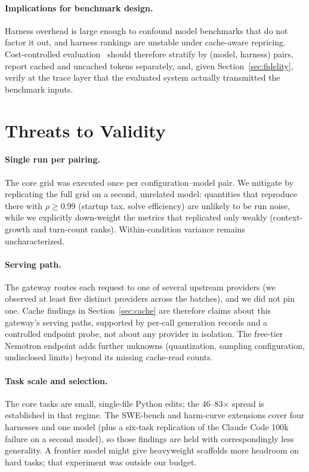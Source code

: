 \documentclass[11pt]{article}
\begin{document}
\paragraph{Implications for benchmark design.}
Harness overhead is large enough to confound model benchmarks that do not factor it out, and harness rankings are unstable under cache-aware repricing. Cost-controlled evaluation~\citep{kapoor2024agents} should therefore stratify by (model, harness) pairs, report cached and uncached tokens separately, and, given Section~\ref{sec:fidelity}, verify at the trace layer that the evaluated system actually transmitted the benchmark inputs.

\section{Threats to Validity}
\label{sec:threats}

\paragraph{Single run per pairing.} The core grid was executed once per configuration--model pair. We mitigate by replicating the full grid on a second, unrelated model: quantities that reproduce there with $\rho \ge 0.99$ (startup tax, solve efficiency) are unlikely to be run noise, while we explicitly down-weight the metrics that replicated only weakly (context-growth and turn-count ranks). Within-condition variance remains uncharacterized.

\paragraph{Serving path.} The gateway routes each request to one of several upstream providers (we observed at least five distinct providers across the batches), and we did not pin one. Cache findings in Section~\ref{sec:cache} are therefore claims about this gateway's serving paths, supported by per-call generation records and a controlled endpoint probe, not about any provider in isolation. The free-tier Nemotron endpoint adds further unknowns (quantization, sampling configuration, undisclosed limits) beyond its missing cache-read counts.

\paragraph{Task scale and selection.} The core tasks are small, single-file Python edits; the 46--83$\times$ spread is established in that regime. The SWE-bench and harm-curve extensions cover four harnesses and one model (plus a six-task replication of the Claude Code 100k failure on a second model), so those findings are held with correspondingly less generality. A frontier model might give heavyweight scaffolds more headroom on hard tasks; that experiment was outside our budget.
\end{document}
